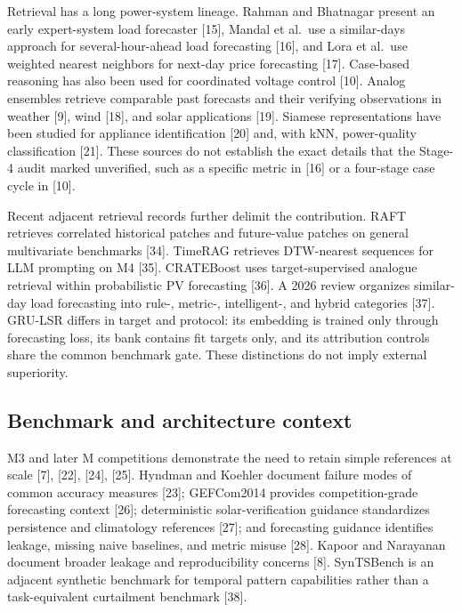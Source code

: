 \documentclass{ieeeaccess}
\begin{document}
Retrieval has a long power-system lineage. Rahman and Bhatnagar present an early expert-system load forecaster {[}15{]}, Mandal et al.~use a similar-days approach for several-hour-ahead load forecasting {[}16{]}, and Lora et al.~use weighted nearest neighbors for next-day price forecasting {[}17{]}. Case-based reasoning has also been used for coordinated voltage control {[}10{]}. Analog ensembles retrieve comparable past forecasts and their verifying observations in weather {[}9{]}, wind {[}18{]}, and solar applications {[}19{]}. Siamese representations have been studied for appliance identification {[}20{]} and, with kNN, power-quality classification {[}21{]}. These sources do not establish the exact details that the Stage-4 audit marked unverified, such as a specific metric in {[}16{]} or a four-stage case cycle in {[}10{]}.

Recent adjacent retrieval records further delimit the contribution. RAFT retrieves correlated historical patches and future-value patches on general multivariate benchmarks {[}34{]}. TimeRAG retrieves DTW-nearest sequences for LLM prompting on M4 {[}35{]}. CRATEBoost uses target-supervised analogue retrieval within probabilistic PV forecasting {[}36{]}. A 2026 review organizes similar-day load forecasting into rule-, metric-, intelligent-, and hybrid categories {[}37{]}. GRU-LSR differs in target and protocol: its embedding is trained only through forecasting loss, its bank contains fit targets only, and its attribution controls share the common benchmark gate. These distinctions do not imply external superiority.

\subsection{Benchmark and architecture context}\label{benchmark-and-architecture-context}

M3 and later M competitions demonstrate the need to retain simple references at scale {[}7{]}, {[}22{]}, {[}24{]}, {[}25{]}. Hyndman and Koehler document failure modes of common accuracy measures {[}23{]}; GEFCom2014 provides competition-grade forecasting context {[}26{]}; deterministic solar-verification guidance standardizes persistence and climatology references {[}27{]}; and forecasting guidance identifies leakage, missing naive baselines, and metric misuse {[}28{]}. Kapoor and Narayanan document broader leakage and reproducibility concerns {[}8{]}. SynTSBench is an adjacent synthetic benchmark for temporal pattern capabilities rather than a task-equivalent curtailment benchmark {[}38{]}.
\end{document}
